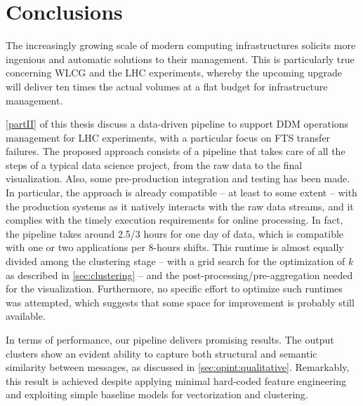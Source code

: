 \chapter{Conclusions} \label{ch:opint:conclusion}

The increasingly growing scale of modern computing infrastructures solicits more ingenious and automatic solutions to their management.
This is particularly true concerning WLCG and the LHC experiments, whereby the upcoming upgrade will deliver ten times the actual volumes at a flat budget for infrastructure management.

\cref{partII} of this thesis discuss a data-driven pipeline to support DDM operations management for LHC experiments, with a particular focus on FTS transfer failures.
The proposed approach consists of a pipeline that takes care of all the steps of a typical data science project, from the raw data to the final visualization.
Also, some pre-production integration and testing has been made.
In particular, the approach is already compatible -- at least to some extent -- with the production systems as it natively interacts with the raw data streams, and it complies with the timely execution requirements for online processing.
In fact,
the pipeline takes around 2.5/3 hours for one day of data, which is compatible with one or two applications per 8-hours shifts.
This runtime is almost equally divided among the clustering stage -- with a grid search for the optimization of $k$ as described in \cref{sec:clustering} -- and the post-processing/pre-aggregation needed for the visualization.
Furthermore, no specific effort to optimize such runtimes was attempted, which suggests that some space for improvement is probably still available.

In terms of performance, our pipeline delivers promising results. 
The output clusters show an evident ability to capture both structural and semantic similarity between messages, as discussed in \cref{sec:opint:qualitative}.
Remarkably, this result is achieved despite applying minimal hard-coded feature engineering and exploiting simple baseline models for vectorization and clustering. 


